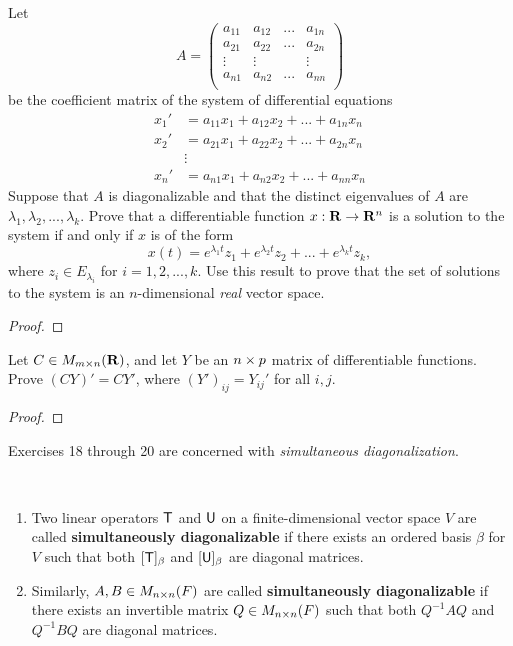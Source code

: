 \begin{exercise} \label{exercise 5.2.16}
Let
\[
    A = \begin{pmatrix}
        a_{11} & a_{12} & ... & a_{1n} \\
        a_{21} & a_{22} & ... & a_{2n} \\
        \vdots & \vdots &     & \vdots \\
        a_{n1} & a_{n2} & ... & a_{nn} \\
    \end{pmatrix}
\]
be the coefficient matrix of the system of differential equations
\begin{align*}
    x_1' & = a_{11} x_1 + a_{12} x_2 + ... + a_{1n} x_n \\
    x_2' & = a_{21} x_1 + a_{22} x_2 + ... + a_{2n} x_n \\
    & \vdots \\
    x_n' & = a_{n1} x_1 + a_{n2} x_2 + ... + a_{nn} x_n
\end{align*}
Suppose that \(A\) is diagonalizable and that the distinct eigenvalues of \(A\) are \(\lambda_1, \lambda_2, ..., \lambda_k\).
Prove that a differentiable function \(x: \mathbf{R} \to \mathbf{R}^n\) is a
solution to the system if and only if \(x\) is of the form
\[
    x(t) = e^{\lambda_1 t} z_1 + e^{\lambda_2 t} z_2 + ... + e^{\lambda_k t} z_k,
\]
where \(z_i \in E_{\lambda_i}\) for \(i = 1, 2, ..., k\).
Use this result to prove that the set of solutions to the system is an \(n\)-dimensional \emph{real} vector space.
\end{exercise}

\begin{proof}
\end{proof}

\begin{exercise} \label{exercise 5.2.17}
Let \(C \in M_{m \times n}(\mathbf{R})\), and let \(Y\) be an \(n \times p\) matrix of differentiable functions.
Prove \((CY)' = CY'\), where \((Y')_{ij} = Y_{ij}'\) for all \(i, j\).
\end{exercise}

\begin{proof}
\end{proof}

Exercises 18 through 20 are concerned with \emph{simultaneous diagonalization}.

\begin{additional definition} \label{adef 5.1} \ 
\begin{enumerate}
\item Two linear operators \(\textsf{T}\) and \(\textsf{U}\) on a finite-dimensional vector space \(V\) are called \textbf{simultaneously diagonalizable} if there exists an ordered basis \(\beta\) for \(V\) such that both \([\textsf{T}]_{\beta}\) and \([\textsf{U}]_{\beta}\) are diagonal matrices.
\item Similarly, \(A, B \in M_{n \times n}(F)\) are called \textbf{simultaneously diagonalizable} if there exists an invertible matrix \(Q \in M_{n \times n}(F)\) such that both \(Q^{-1} A Q\) and \(Q^{-1} B Q\) are diagonal matrices.
\end{enumerate}
\end{additional definition}

